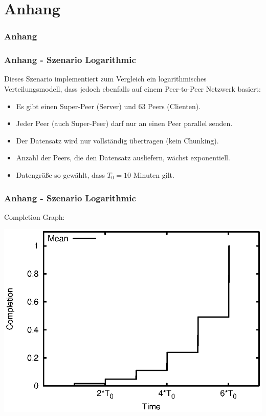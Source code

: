 
\section{Anhang}


\begin{frame}
  \frametitle{Anhang}
\end{frame}


\begin{frame}
  \frametitle{Anhang - Szenario Logarithmic}
  Dieses Szenario implementiert zum Vergleich ein logarithmisches Verteilungsmodell, dass jedoch ebenfalls auf einem Peer-to-Peer Netzwerk basiert:

  \begin{itemize}  
    \item Es gibt einen Super-Peer (Server) und 63 Peers (Clienten).
    \item Jeder Peer (auch Super-Peer) darf nur an einen Peer parallel senden.
    \item Der Datensatz wird nur vollständig übertragen (kein Chunking).
    \item Anzahl der Peers, die den Datensatz ausliefern, wächst exponentiell.
    \item Datengröße so gewählt, dass $T_0=10$ Minuten gilt.
  \end{itemize}
\end{frame}

\begin{frame}
  \frametitle{Anhang - Szenario Logarithmic}
  Completion Graph:
  
  \begin{center}
    \includegraphics[width=1\textwidth]{fig/plots/scenario_3_log/plots/GeneratedMeanChunkCompletion.csv.eps}
  \end{center}
\end{frame}


